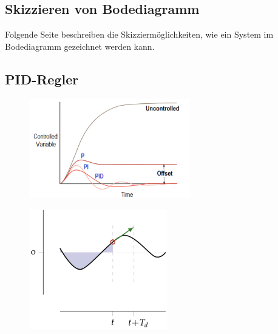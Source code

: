 \documentclass[
  10pt,
  a4paper,
]{article}
\numberwithin{equation}{section}
\begin{document}
\begin{multicols}{2}
\begin{figure}[H]
{}

\end{figure}

\hypertarget{skizzieren-von-bodediagramm}{%
\subsection{Skizzieren von
Bodediagramm}\label{skizzieren-von-bodediagramm}}

Folgende Seite beschreiben die Skizziermöglichkeiten, wie ein System im
Bodediagramm gezeichnet werden kann.

\end{multicols}
\newpage

\begin{multicols}{2}

\hypertarget{pid-regler}{%
\section{PID-Regler}\label{pid-regler}}

\begin{figure}[H]

{\centering \includegraphics[width=7cm,height=\textheight]{images/pid_regler/PID-Controller-Graph-1906105412.png}

}

\end{figure}

\begin{figure}[H]

{\centering \includegraphics[width=6cm,height=\textheight]{images/pid_regler/pid_graph.png}

}
\end{figure}
\end{multicols}
\end{document}
